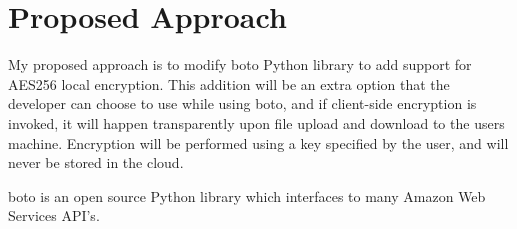 \section{Proposed Approach}

My proposed approach is to modify boto Python library to add support for AES256 local encryption. 
This addition will be an extra option that the developer can choose to use while using boto, and if client-side encryption
is invoked, it will happen transparently upon file upload and download to the users machine. Encryption will be performed
using a key specified by the user, and will never be stored in the cloud.

boto is an open source Python library which interfaces to many Amazon Web Services API's.

